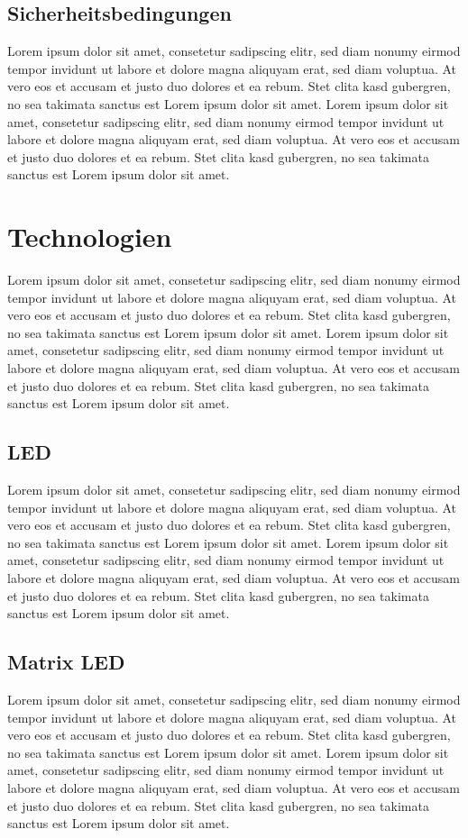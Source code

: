 \subsection{Sicherheitsbedingungen}
Lorem ipsum dolor sit amet, consetetur sadipscing elitr, sed diam nonumy eirmod tempor invidunt ut labore et dolore magna aliquyam erat, sed diam voluptua. At vero eos et accusam et justo duo dolores et ea rebum. Stet clita kasd gubergren, no sea takimata sanctus est Lorem ipsum dolor sit amet. Lorem ipsum dolor sit amet, consetetur sadipscing elitr, sed diam nonumy eirmod tempor invidunt ut labore et dolore magna aliquyam erat, sed diam voluptua. At vero eos et accusam et justo duo dolores et ea rebum. Stet clita kasd gubergren, no sea takimata sanctus est Lorem ipsum dolor sit amet.

\section{Technologien}
Lorem ipsum dolor sit amet, consetetur sadipscing elitr, sed diam nonumy eirmod tempor invidunt ut labore et dolore magna aliquyam erat, sed diam voluptua. At vero eos et accusam et justo duo dolores et ea rebum. Stet clita kasd gubergren, no sea takimata sanctus est Lorem ipsum dolor sit amet. Lorem ipsum dolor sit amet, consetetur sadipscing elitr, sed diam nonumy eirmod tempor invidunt ut labore et dolore magna aliquyam erat, sed diam voluptua. At vero eos et accusam et justo duo dolores et ea rebum. Stet clita kasd gubergren, no sea takimata sanctus est Lorem ipsum dolor sit amet.
\subsection{LED}
Lorem ipsum dolor sit amet, consetetur sadipscing elitr, sed diam nonumy eirmod tempor invidunt ut labore et dolore magna aliquyam erat, sed diam voluptua. At vero eos et accusam et justo duo dolores et ea rebum. Stet clita kasd gubergren, no sea takimata sanctus est Lorem ipsum dolor sit amet. Lorem ipsum dolor sit amet, consetetur sadipscing elitr, sed diam nonumy eirmod tempor invidunt ut labore et dolore magna aliquyam erat, sed diam voluptua. At vero eos et accusam et justo duo dolores et ea rebum. Stet clita kasd gubergren, no sea takimata sanctus est Lorem ipsum dolor sit amet.
\subsection{Matrix LED}
Lorem ipsum dolor sit amet, consetetur sadipscing elitr, sed diam nonumy eirmod tempor invidunt ut labore et dolore magna aliquyam erat, sed diam voluptua. At vero eos et accusam et justo duo dolores et ea rebum. Stet clita kasd gubergren, no sea takimata sanctus est Lorem ipsum dolor sit amet. Lorem ipsum dolor sit amet, consetetur sadipscing elitr, sed diam nonumy eirmod tempor invidunt ut labore et dolore magna aliquyam erat, sed diam voluptua. At vero eos et accusam et justo duo dolores et ea rebum. Stet clita kasd gubergren, no sea takimata sanctus est Lorem ipsum dolor sit amet.
